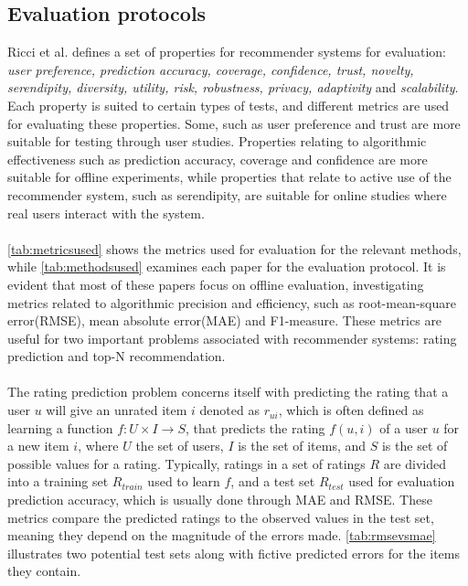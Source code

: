 \subsection{Evaluation protocols}\label{sec:evaluationmetrics}
Ricci et al. \cite{RecommenderHandbook2015} defines a set of properties for recommender systems for evaluation: \textit{user preference, prediction accuracy, coverage, confidence, trust, novelty, serendipity, diversity, utility, risk, robustness, privacy, adaptivity} and \textit{scalability}.
Each property is suited to certain types of tests, and different metrics are used for evaluating these properties.
Some, such as user preference and trust are more suitable for testing through user studies.
Properties relating to algorithmic effectiveness such as prediction accuracy, coverage and confidence are more suitable for offline experiments, while properties that relate to active use of the recommender system, such as serendipity, are suitable for online studies where real users interact with the system.
\\\\
\autoref{tab:metricsused} shows the metrics used for evaluation for the relevant methods, while \autoref{tab:methodsused} examines each paper for the evaluation protocol.
It is evident that most of these papers focus on offline evaluation, investigating metrics related to algorithmic precision and efficiency, such as root-mean-square error(RMSE), mean absolute error(MAE) and F1-measure.
These metrics are useful for two important problems associated with recommender systems: rating prediction and top-N recommendation\cite{RecommenderHandbook2015}.
\\\\
The rating prediction problem concerns itself with predicting the rating that a user $u$ will give an unrated item $i$ denoted as $r_{ui}$, which is often defined as learning a function $f : U \times I \rightarrow S$, that predicts the rating $f(u, i)$ of a user $u$ for a new item $i$, where $U$ the set of users, $I$ is the set of items, and $S$ is the set of possible values for a rating.
Typically, ratings in a set of ratings $R$ are divided into a training set $R_{train}$ used to learn $f$, and a test set $R_{test}$ used for evaluation prediction accuracy, which is usually done through MAE and RMSE.
These metrics compare the predicted ratings to the observed values in the test set, meaning they depend on the magnitude of the errors made.
\autoref{tab:rmsevsmae} illustrates two potential test sets along with fictive predicted errors for the items they contain.
